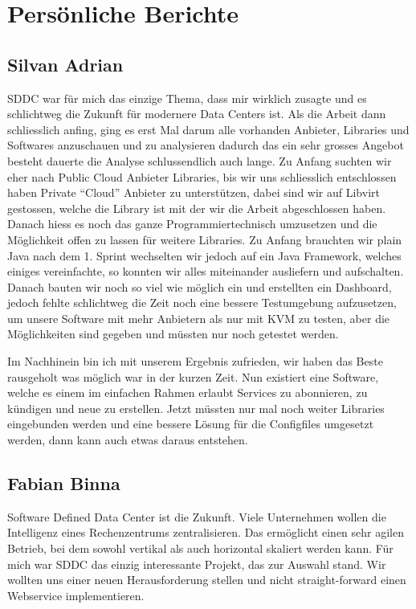 \chapter{Persönliche Berichte}

\section{Silvan Adrian}

SDDC war für mich das einzige Thema, dass mir wirklich zusagte und es 
schlichtweg die Zukunft für modernere Data Centers ist.
Als die Arbeit dann schliesslich anfing, ging es erst Mal darum alle vorhanden 
Anbieter, Libraries und Softwares anzuschauen und zu analysieren dadurch das ein sehr 
grosses Angebot besteht dauerte die Analyse schlussendlich auch lange.
Zu Anfang suchten wir eher nach Public Cloud Anbieter Libraries, bis 
wir uns schliesslich entschlossen haben Private ``Cloud'' Anbieter zu 
unterstützen, dabei sind wir auf Libvirt gestossen, welche die 
Library ist mit der wir die Arbeit abgeschlossen haben.
Danach hiess es noch das ganze Programmiertechnisch umzusetzen und die 
Möglichkeit offen zu lassen für weitere Libraries.
Zu Anfang brauchten wir plain Java nach dem 1. Sprint wechselten wir jedoch auf ein 
Java Framework, welches einiges 
vereinfachte, so konnten wir alles miteinander ausliefern und aufschalten.
Danach bauten wir noch so viel wie möglich ein und erstellten ein Dashboard, jedoch fehlte schlichtweg die 
Zeit noch eine bessere Testumgebung aufzusetzen, um unsere Software mit mehr 
Anbietern als nur mit KVM zu testen, aber die Möglichkeiten sind gegeben und 
müssten nur noch getestet werden.

Im Nachhinein bin ich mit unserem Ergebnis zufrieden, wir haben das Beste 
rausgeholt was möglich war in der kurzen Zeit.
Nun existiert eine Software, welche es einem im einfachen Rahmen erlaubt 
Services zu abonnieren, zu kündigen und neue zu erstellen.
Jetzt müssten nur mal noch weiter Libraries eingebunden werden und eine bessere 
Lösung für die Configfiles umgesetzt werden, dann kann auch etwas daraus entstehen.


\section{Fabian Binna}

Software Defined Data Center ist die Zukunft. Viele Unternehmen wollen die Intelligenz eines Rechenzentrums zentralisieren. Das ermöglicht einen sehr agilen Betrieb, bei dem sowohl vertikal als auch horizontal skaliert werden kann. Für mich war SDDC das einzig interessante Projekt, das zur Auswahl stand. Wir wollten uns einer neuen Herausforderung stellen und nicht straight-forward einen Webservice implementieren.\\


